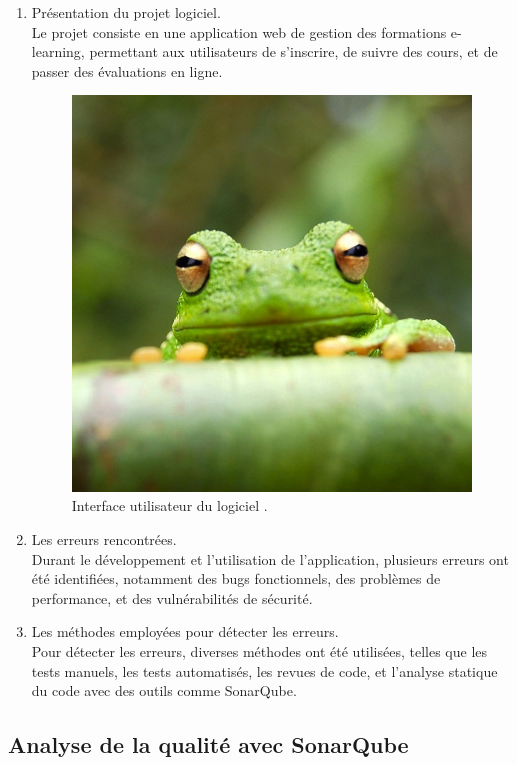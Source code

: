 \documentclass{article}
\begin{document}
\begin{enumerate}
    \item Présentation du projet logiciel. \\
    Le projet consiste en une application web de gestion des formations e-learning, permettant aux utilisateurs de s’inscrire, de suivre des cours, et de passer des évaluations en ligne.
    \begin{figure}[H]
    \centering
    \includegraphics[width=0.5\linewidth]{assets/frog.jpg}
    \caption{\label{fig:frog}Interface utilisateur du logiciel .}
    \end{figure}

    \item Les erreurs rencontrées. \\
    Durant le développement et l'utilisation de l'application, plusieurs erreurs ont été identifiées, notamment des bugs fonctionnels, des problèmes de performance, et des vulnérabilités de sécurité.

    \item Les méthodes employées pour détecter les erreurs. \\
    Pour détecter les erreurs, diverses méthodes ont été utilisées, telles que les tests manuels, les tests automatisés, les revues de code, et l'analyse statique du code avec des outils comme SonarQube.
 
\end{enumerate}

\subsection{Analyse de la qualité avec SonarQube}
\end{document}
